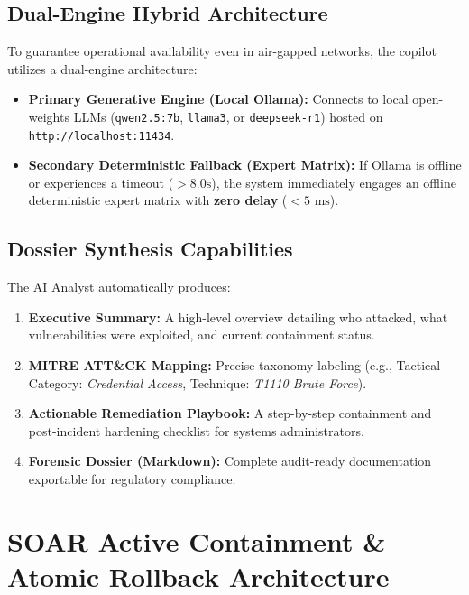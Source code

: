 \documentclass[11pt,a4paper]{article}
\begin{document}
\subsection{Dual-Engine Hybrid Architecture}
To guarantee operational availability even in air-gapped networks, the copilot utilizes a dual-engine architecture:
\begin{itemize}
    \item \textbf{Primary Generative Engine (Local Ollama):} Connects to local open-weights LLMs (\texttt{qwen2.5:7b}, \texttt{llama3}, or \texttt{deepseek-r1}) hosted on \texttt{http://localhost:11434}.
    \item \textbf{Secondary Deterministic Fallback (Expert Matrix):} If Ollama is offline or experiences a timeout ($> 8.0\text{s}$), the system immediately engages an offline deterministic expert matrix with \textbf{zero delay} ($< 5\text{ ms}$).
\end{itemize}

\subsection{Dossier Synthesis Capabilities}
The AI Analyst automatically produces:
\begin{enumerate}
    \item \textbf{Executive Summary:} A high-level overview detailing who attacked, what vulnerabilities were exploited, and current containment status.
    \item \textbf{MITRE ATT\&CK Mapping:} Precise taxonomy labeling (e.g., Tactical Category: \textit{Credential Access}, Technique: \textit{T1110 Brute Force}).
    \item \textbf{Actionable Remediation Playbook:} A step-by-step containment and post-incident hardening checklist for systems administrators.
    \item \textbf{Forensic Dossier (Markdown):} Complete audit-ready documentation exportable for regulatory compliance.
\end{enumerate}

\section{SOAR Active Containment \& Atomic Rollback Architecture}
\end{document}
